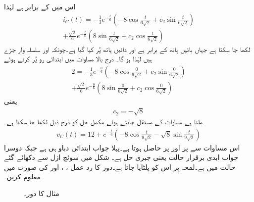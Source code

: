 اس میں  کے برابر ہے لہٰذا
\begin{multline*}
i_C(t)=-\frac{1}{3}e^{-\frac{t}{6}}\left(-8 \cos \frac{t}{6\sqrt{2}}+c_2 \sin \frac{t}{6\sqrt{2}}\right)\\+\frac{\sqrt{2}}{6}e^{-\frac{t}{6}}\left(8 \sin \frac{t}{6\sqrt{2}}+c_2 \cos \frac{t}{6\sqrt{2}}\right)
\end{multline*}
لکھا جا سکتا ہے جہاں بائیں ہاتھ  کے برابر ہے اور دائیں ہاتھ  پُر کیا گیا ہے۔چونکہ  اور  سلسلہ وار جڑے ہیں لہٰذا  ہو گا۔ درج بالا مساوات میں ابتدائی رو  پُر کرتے ہوئے
\begin{multline*}
2=-\frac{1}{3}e^{-\frac{0}{6}}\left(-8 \cos \frac{0}{6\sqrt{2}}+c_2 \sin \frac{0}{6\sqrt{2}}\right)\\
+\frac{\sqrt{2}}{6}e^{-\frac{0}{6}}\left(8 \sin \frac{0}{6\sqrt{2}}+c_2 \cos \frac{0}{6\sqrt{2}}\right)
\end{multline*}
یعنی
\begin{align*}
c_2=-\sqrt{8}
\end{align*}
ملتا ہے۔مساوات کے مستقل جانتے ہوئے مکمل حل کو درج ذیل لکھا جا سکتا ہے۔
\begin{align}
v_C(t)=12+e^{-\frac{t}{6}}\left(-8\cos \frac{t}{9\sqrt{2}}-\sqrt{8}\sin \frac{t}{9\sqrt{2}} \right)
\end{align}
اس مساوات سے  پر  اور  پر  حاصل ہوتا ہے۔پہلا جواب ابتدائی دباو ہی ہے جبکہ دوسرا جواب ابدی برقرار حالت یعنی جبری حل ہے۔ 
شکل  میں سوئچ ازل سے دکھائے گئے حالت میں ہے۔لمحہ  پر اس کو پلٹایا جاتا ہے۔دور کا رد عمل ، ،  اور  کی صورت میں معلوم کریں۔
\begin{figure}
\centering
{}
\caption{مثال  کا دور۔}
\label{شکل_عارضی_مستطیل_دباو_ب}
\end{figure}


